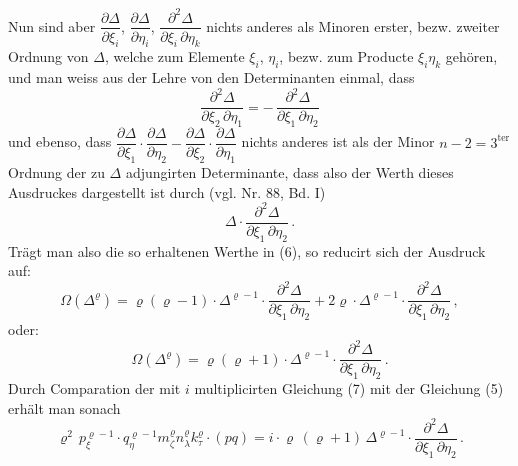 \documentclass[11pt]{article}
\providecommand{\weberpage}[1]{}
\providecommand{\weq}[2]{\begin{equation}\tag{#1}#2\end{equation}}
\let\Delta\varDelta
\let\Omega\varOmega
\begin{document}
\weberpage{117}
Nun sind aber $\dfrac{\partial \Delta}{\partial \xi_i}$, $\dfrac{\partial \Delta}{\partial \eta_i}$, $\dfrac{\partial^2 \Delta}{\partial \xi_i\, \partial \eta_k}$ nichts anderes als Minoren erster, bezw. zweiter Ordnung von $\Delta$, welche zum Elemente $\xi_i$, $\eta_i$, bezw. zum Producte $\xi_i \eta_k$ geh\"oren, und man weiss aus der Lehre von den Determinanten einmal, dass
\[
\frac{\partial^2 \Delta}{\partial \xi_2\, \partial \eta_1} = -\, \frac{\partial^2 \Delta}{\partial \xi_1\, \partial \eta_2}
\]
und ebenso, dass $\dfrac{\partial \Delta}{\partial \xi_1} \cdot \dfrac{\partial \Delta}{\partial \eta_2} - \dfrac{\partial \Delta}{\partial \xi_2} \cdot \dfrac{\partial \Delta}{\partial \eta_1}$ nichts anderes ist als der Minor $n - 2 = 3^{\text{ter}}$ Ordnung der zu $\Delta$ adjungirten Determinante, dass also der Werth dieses Ausdruckes dargestellt ist durch (vgl. Nr. 88, Bd. I)
\[
\Delta \cdot \frac{\partial^2 \Delta}{\partial \xi_1\, \partial \eta_2}\,.
\]
Tr\"agt man also die so erhaltenen Werthe in (6), so reducirt sich der Ausdruck auf:
\[
\Omega(\Delta^{\varrho}) = \varrho(\varrho - 1)\cdot \Delta^{\varrho-1}\cdot \frac{\partial^2 \Delta}{\partial \xi_1\, \partial \eta_2} + 2\varrho \cdot \Delta^{\varrho-1}\cdot \frac{\partial^2 \Delta}{\partial \xi_1\, \partial \eta_2}\,,
\]
oder:
\weq{7}{\Omega(\Delta^{\varrho}) = \varrho(\varrho + 1)\cdot \Delta^{\varrho-1}\cdot \frac{\partial^2 \Delta}{\partial \xi_1\, \partial \eta_2}\,.}
Durch Comparation der mit $i$ multiplicirten Gleichung (7) mit der Gleichung (5) erh\"alt man sonach
\weq{I}{\varrho^2\, p_{\xi}^{\varrho-1} \cdot q_{\eta}^{\varrho-1} m_{\zeta}^{\varrho} n_{\lambda}^{\varrho} k_{\tau}^{\varrho} \cdot (pq) = i \cdot \varrho\, (\varrho + 1)\, \Delta^{\varrho-1}\cdot \frac{\partial^2 \Delta}{\partial \xi_1\, \partial \eta_2}\,.}
\end{document}
